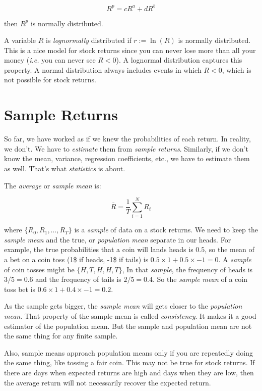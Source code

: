\begin{equation}
    R^p = cR^a + dR^b
\end{equation}

then $R^p$ is normally distributed. 

A variable $R$ is \textit{lognormally} distributed 
if $r := \ln(R)$ is normally distributed.
This is a nice model for stock returns since you 
can never lose more than all your money (\textit{i.e.}
you can never see $R < 0$). A lognormal distribution
captures this property.
A normal distribution always includes events 
in which $R < 0$, which is not possible for stock returns.

\section{Sample Returns}

So far, we have worked as if we knew the probabilities
of each return. In reality, we don't. We have to
\textit{estimate} them from \textit{sample returns}.
Similarly, if we don't know the mean, variance, regression
coefficients, etc., we have to estimate them as well.
That's what \textit{statistics} is about.

The \textit{average} or \textit{sample mean} is:

\begin{equation}
    \bar{R} = \frac{1}{T}\sum_{i=1}^N R_t
\end{equation}

where $\{R_0, R_1, \ldots, R_{T}\}$ is a \textit{sample}
of data on a stock returns. We need to keep the 
\textit{sample mean} and the true, or \textit{population mean}
separate in our heads. For example, the true 
probabilities that a coin will lands heads is $0.5$, 
so the mean of a bet on a coin toss (1\$ if heads, -1\$ if tails)
is $0.5 \times 1 + 0.5 \times -1 = 0$.
A \textit{sample} of coin tosses might be $\{H, T, H, H, T\}$,
In that \textit{sample}, the frequency of heads is $3/5 = 0.6$ and 
the frequency of tails is $2/5 = 0.4$. So the \textit{sample mean}
of a coin toss bet is $0.6 \times 1 + 0.4 \times -1 = 0.2$.

As the sample gets bigger, the \textit{sample mean} 
will gets closer to the \textit{population mean}. 
That property of the sample mean is called \textit{consistency}.
It makes it a good estimator of the population mean.
But the sample and population mean are not the same thing 
for any finite sample.

Also, sample means approach population means only if 
you are repeatedly doing the same thing, like tossing
a fair coin. This may not be true for stock returns. 
If there are days when expected returns are high and
days when they are low, then the average return 
will not necessarily recover the expected return.

